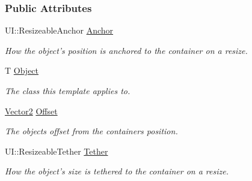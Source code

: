\subsubsection*{Public Attributes}
\begin{DoxyCompactItemize}
\item 
\hypertarget{structphys_1_1UI_1_1ResizingInfo_a2164abb4b82f0b7d26d13a13cc480010}{
UI::ResizeableAnchor \hyperlink{structphys_1_1UI_1_1ResizingInfo_a2164abb4b82f0b7d26d13a13cc480010}{Anchor}}
\label{structphys_1_1UI_1_1ResizingInfo_a2164abb4b82f0b7d26d13a13cc480010}

\begin{DoxyCompactList}\small\item\em How the object's position is anchored to the container on a resize. \item\end{DoxyCompactList}\item 
\hypertarget{structphys_1_1UI_1_1ResizingInfo_a2f925cf9136fdba5612d9ba741201dc2}{
T \hyperlink{structphys_1_1UI_1_1ResizingInfo_a2f925cf9136fdba5612d9ba741201dc2}{Object}}
\label{structphys_1_1UI_1_1ResizingInfo_a2f925cf9136fdba5612d9ba741201dc2}

\begin{DoxyCompactList}\small\item\em The class this template applies to. \item\end{DoxyCompactList}\item 
\hypertarget{structphys_1_1UI_1_1ResizingInfo_ab9dbc0f04f78ff0081b54e461a37a75e}{
\hyperlink{classphys_1_1Vector2}{Vector2} \hyperlink{structphys_1_1UI_1_1ResizingInfo_ab9dbc0f04f78ff0081b54e461a37a75e}{Offset}}
\label{structphys_1_1UI_1_1ResizingInfo_ab9dbc0f04f78ff0081b54e461a37a75e}

\begin{DoxyCompactList}\small\item\em The objects offset from the containers position. \item\end{DoxyCompactList}\item 
\hypertarget{structphys_1_1UI_1_1ResizingInfo_ab38a235a394d8c3bf3e15f331e94ae3b}{
UI::ResizeableTether \hyperlink{structphys_1_1UI_1_1ResizingInfo_ab38a235a394d8c3bf3e15f331e94ae3b}{Tether}}
\label{structphys_1_1UI_1_1ResizingInfo_ab38a235a394d8c3bf3e15f331e94ae3b}

\begin{DoxyCompactList}\small\item\em How the object's size is tethered to the container on a resize. \item\end{DoxyCompactList}\end{DoxyCompactItemize}



